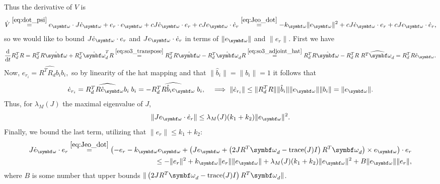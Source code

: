 Thus the derivative of $V$ is
\begin{equation}
  \begin{aligned}
    \dot V \overset{\eqref{eq:dot_psi}}= e_\bomega \cdot J \dot e_\bomega + e_r \cdot e_\bomega + c J \dot e_\bomega \cdot e_r + c J e_\bomega \cdot \dot e_r
    \overset{\eqref{eq:Jeo_dot}}= -k_\bomega \| e_\bomega \|^2 + c J \dot e_\bomega \cdot e_r + c J e_\bomega \cdot \dot e_r,
  \end{aligned}
\end{equation}
so we would like to bound $J \dot e_\bomega \cdot e_r$ and $J e_\bomega \cdot \dot e_r$ in terms of $\| e_\bomega \|$ and $\| e_r \|$.  First we have
\begin{equation}
  \label{eq:rdr_dt}
  \frac{\mathrm{d}}{\mathrm{d}t} R_d^T R = R_d^T R \hat \bomega + R_d^T \hat \bomega_d^T R \overset{\eqref{eq:so3_transpose}} = R_d^T R \hat \bomega - R_d^T \hat \bomega_d R \overset{\eqref{eq:so3_adjoint_hat}}= R_d^T R \hat \bomega - R_d^T R \; \widehat{R^T \bomega_d} = R_d^T R \hat e_\bomega.
\end{equation}
Now, $e_{r_i} = \widehat{R^T R_d b_i} b_i,$ so by linearity of the hat mapping and that $\| \hat b_i \| = \| b_i \| = 1$ it follows that
\begin{equation}
  \dot e_{r_i} = \widehat{R_d^T R \hat e_\bomega b_i} \; b_i = - \widehat{R_d^T R \hat b_i e_\bomega} \; b_i, \quad \implies \| \dot e_{r_i} \| \leq \| R_d^T R \| \| \hat b_i \| \| e_\bomega \| \| b_i \| = \| e_\bomega \|.
\end{equation}
Thus, for $\lambda_M(J)$ the maximal eigenvalue of $J$,
\begin{equation}
  \| J e_\bomega \cdot \dot e_r \| \leq \lambda_M(J) (k_1 + k_2) \| e_\bomega \|^2.
\end{equation}
Finally, we bound the last term, utilizing that $\| e_r \| \leq k_1 + k_2$:
\begin{equation}
  \begin{aligned}
    J \dot e_\bomega \cdot  e_r  \overset{\eqref{eq:Jeo_dot}}= \left( -e_r - k_\bomega e_\bomega + \left( J e_\bomega + \left(2 J R^T \bomega_d - \text{trace}(J) I \right) R^T \bomega_d \right) \times e_\bomega \right) \cdot e_r \\
    \leq - \| e_r \|^2 + k_\bomega \| e_r \| \| e_\bomega \| + \lambda_M(J) (k_1 + k_2) \| e_\bomega \|^2 + B \| e_\bomega \| \| e_r \|,
  \end{aligned}
\end{equation}
where $B$ is some number that upper bounds $\| \left( 2 J R^T \bomega_d - \text{trace}(J) I \right) R^T \bomega_d \|$.

